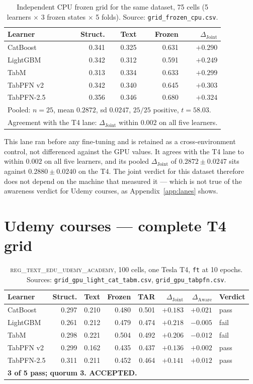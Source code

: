 \documentclass[10pt,letterpaper]{article}
\newcommand{\dj}{\Delta_{\mathrm{Joint}}}
\newcommand{\da}{\Delta_{\mathrm{Aware}}}
\begin{document}
\begin{table}[H]
\centering\small
\caption{Independent CPU frozen grid for the same dataset, 75 cells (5 learners $\times$ 3
frozen states $\times$ 5 folds). Source: \texttt{grid\_frozen\_cpu.csv}.}
\begin{tabular}{lrrrr}
\toprule
Learner & Struct. & Text & Frozen & $\dj$ \\
\midrule
CatBoost   & 0.341 & 0.325 & 0.631 & $+0.290$ \\
LightGBM   & 0.342 & 0.312 & 0.591 & $+0.249$ \\
TabM       & 0.313 & 0.334 & 0.633 & $+0.299$ \\
TabPFN v2  & 0.342 & 0.340 & 0.645 & $+0.303$ \\
TabPFN-2.5 & 0.356 & 0.346 & 0.680 & $+0.324$ \\
\midrule
\multicolumn{5}{l}{Pooled: $n{=}25$, mean $0.2872$, sd $0.0247$, $25/25$ positive, $t = 58.03$.} \\
\multicolumn{5}{l}{Agreement with the T4 lane: $\dj$ within $0.002$ on all five learners.} \\
\bottomrule
\end{tabular}
\end{table}

\noindent This lane ran before any fine-tuning and is retained as a cross-environment control, not
differenced against the GPU values. It agrees with the T4 lane to within $0.002$ on all five
learners, and its pooled $\dj$ of $0.2872 \pm 0.0247$ sits against $0.2880 \pm 0.0240$ on the
T4. The joint verdict for this dataset therefore does not depend on the machine that measured
it --- which is not true of the awareness verdict for Udemy courses, as
Appendix~\ref{app:lanes} shows.


\clearpage
\section{Udemy courses --- complete T4 grid}
\label{app:udemy}

\begin{table}[H]
\centering\small
\caption{\textsc{reg\_text\_edu\_udemy\_academy}, 100 cells, one Tesla T4, \texttt{ft} at 10
epochs. Sources: \texttt{grid\_gpu\_light\_cat\_tabm.csv}, \texttt{grid\_gpu\_tabpfn.csv}.}
\begin{tabular}{lrrrrrrl}
\toprule
Learner & Struct. & Text & Frozen & TAR & $\dj$ & $\da$ & Verdict \\
\midrule
CatBoost   & 0.297 & 0.210 & 0.480 & 0.501 & $+0.183$ & $+0.021$ & pass \\
LightGBM   & 0.261 & 0.212 & 0.479 & 0.474 & $+0.218$ & $-0.005$ & fail \\
TabM       & 0.298 & 0.221 & 0.504 & 0.492 & $+0.206$ & $-0.012$ & fail \\
TabPFN v2  & 0.299 & 0.162 & 0.435 & 0.437 & $+0.136$ & $+0.002$ & pass \\
TabPFN-2.5 & 0.311 & 0.211 & 0.452 & 0.464 & $+0.141$ & $+0.012$ & pass \\
\midrule
\multicolumn{8}{l}{\textbf{3 of 5 pass; quorum 3. ACCEPTED.}} \\
\bottomrule
\end{tabular}
\end{table}
\end{document}
